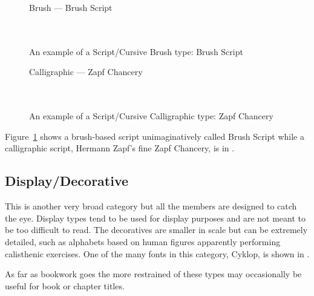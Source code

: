 \documentclass[10pt,a4paper,oneside,extrafontsizes]{memoir}%
\begin{document}
\begin{figure}
\centering
{\centering%
  Brush  --- Brush Script \\
  \UCalphabet \\
  \LCalphabet \\
  \fox\par}
\caption{An example of a Script/Cursive Brush type: Brush Script} 
   \label{fig:brush}
\end{figure}

\begin{figure}
\centering
{\centering{}\selectfont
  Calligraphic --- Zapf Chancery \\
  \UCalphabet \\
  \LCalphabet \\
  \fox\par}
\caption{An example of a Script/Cursive Calligraphic type: Zapf Chancery} 
   \label{fig:chancery}
\end{figure}

\begin{paracol}{2}
\switchEng
    Figure~\ref{fig:brush} shows a brush-based script 
unimaginatively called 
Brush Script while a
calligraphic script, Hermann Zapf's fine
Zapf Chancery,
is in .
\end{paracol}

\subsection{Display/Decorative}

\begin{paracol}{2}
\switchEng
    This is another very broad category 
but all the members are designed
to catch the eye. Display types tend to be used for display purposes and
are not meant to be too difficult to read. The decoratives are smaller in scale
but can be extremely detailed, such as alphabets based on human figures 
apparently performing calisthenic exercises. One of the many fonts
in this category, Cyklop, is shown in 
.

    As far as bookwork goes the more restrained of these types may occasionally
be useful for book or chapter titles.
\end{paracol}
\end{document}

